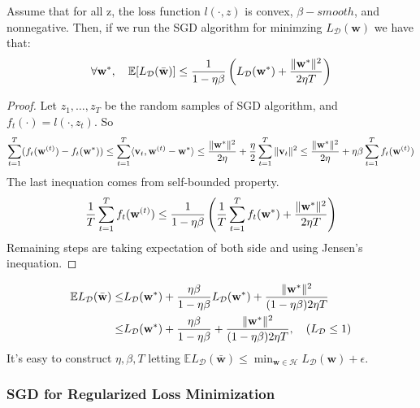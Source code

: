  \begin{thm}
	 Assume that for all z, the loss function $ l(\cdot, z) $ is convex, $ \beta-smooth $, and nonnegative.
	 Then, if we run the SGD algorithm for minimzing $ L_{\mathcal{D}}(\mathbf{w}) $ we have that:
	 \begin{equation}
	 	\forall \mathbf{w^*},\quad 
		\mathbb{E} [L_{\mathcal{D}}(\bar{\mathbf{w}})]
		\le \frac{1}{1-\eta\beta}
		\left( 
			L_{\mathcal{D}}(\mathbf{w^*}) + \frac{\Arrowvert \mathbf{w^*} \Arrowvert^2}{2\eta T}	
		\right)
	 \end{equation}
	 \begin{proof}
	 	Let $ z_1, \dots, z_T $ be the random samples of SGD algorithm,
		and $ f_t(\cdot) = l(\cdot, z_t) $. So
		\[ 
			\sum\limits^T_{t=1} (f_t(\mathbf{w}^{(t)}) - f_t(\mathbf{w}^*))
			\le \sum\limits^T_{t=1} \langle \mathbf{v}_t, \mathbf{w}^{(t)} - \mathbf{w^*} \rangle
			\le \frac{\Arrowvert \mathbf{w^*} \Arrowvert^2}{2\eta} + 
			\frac{\eta}{2} \sum\limits^T_{t=1} \Arrowvert \mathbf{v}_t \Arrowvert^2 
			\le \frac{\Arrowvert \mathbf{w^*} \Arrowvert^2}{2\eta} + 
			\eta \beta \sum\limits^{T}_{t=1}f_t(\mathbf{w}^{(t)})
		\]
		The last inequation comes from self-bounded property.
		\[ 
			\frac{1}{T}\sum\limits^T_{t=1}f_t(\mathbf{w}^{(t)})
			\le \frac{1}{1-\eta\beta}
			\left( 
				\frac{1}{T}	\sum\limits^T_{t=1}f_t(\mathbf{w}^*) + 
			\frac{\Arrowvert \mathbf{w}^* \Arrowvert^2}{2\eta T}	
			\right)
		\]
		Remaining steps are taking expectation of both side and using Jensen's inequation.
	 \end{proof}
 \end{thm}
\begin{align*}
    \mathbb{E}{L_ \mathcal{D}(\bar{\textbf{w}})}
    \le& L_ \mathcal{D}(\textbf{w}^*) + \frac{\eta \beta}{1- \eta \beta} L_ \mathcal{D}( \textbf{w}^*)
    + \frac{\Arrowvert \mathbf{w}^* \Arrowvert^2}{(1 - \eta \beta)2 \eta T} \\
    \le& L_ \mathcal{D}(\textbf{w}^*) + \frac{\eta \beta}{1- \eta \beta} + \frac{\Arrowvert \mathbf{w}^* \Arrowvert^2}{(1 - \eta \beta)2 \eta T},
    \quad (L_ \mathcal{D} \le 1) \\
\end{align*}
It's easy to construct $ \eta, \beta, T $ letting $ \mathbb{E}L_ \mathcal{D} (\bar{\mathbf{w}}) \le \min_{ \mathbf{w} \in \mathcal{H}} L_ \mathcal{D}( \mathbf{w}) + \epsilon$. 

 \subsubsection{SGD for Regularized Loss Minimization}

